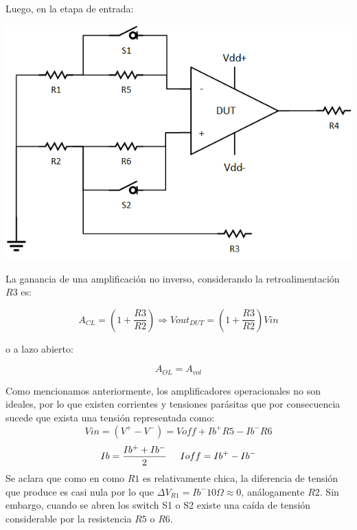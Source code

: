 Luego, en la etapa de entrada:

\begin{minipage}{.55\textwidth}
    \begin{center}
        \includegraphics[scale = 0.5]{etapa1.png}
        \label{ej2et2}
    \end{center}
\end{minipage}
\begin{minipage}{0.35\textwidth}
    
    La ganancia de una amplificación no inverso, considerando la retroalimentación $R3$ es:
    
    $$A_{CL} = \left( 1 + \frac{R3}{R2}\right) \Longrightarrow Vout_{DUT} = \left( 1 + \frac{R3}{R2}\right) Vin$$
    
    o a lazo abierto:
    
    $$A_{OL} = A_{vol}$$
\end{minipage}

Como mencionamos anteriormente, los amplificadores operacionales no son ideales, por lo que existen corrientes y tensiones parásitas que por consecuencia sucede que exista una tensión representada como:
$$Vin = (V^+ - V^-) = Voff + Ib^+ R5 - Ib^- R6$$
$$Ib = \frac{Ib^+ +  Ib^-}{2} \hspace{0.5 cm} Ioff = Ib^+ -  Ib^-$$
Se aclara que como en como $R1$ es relativamente chica, la diferencia de tensión que produce es casi nula por lo que $\Delta V_{R1} = Ib^- 10\Omega \approx 0$, análogamente $R2$. Sin embargo, cuando se abren los switch S1 o S2 existe una caída de tensión considerable por la resistencia $R5$ o $R6$.

